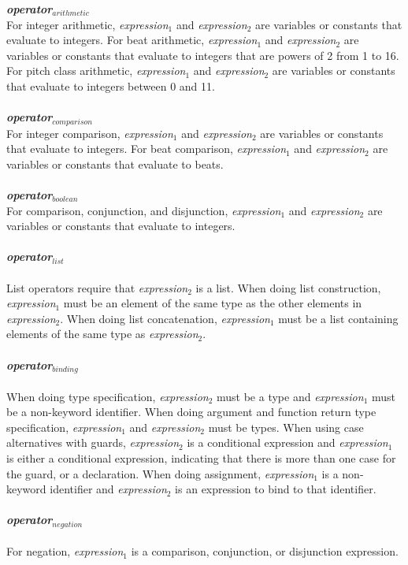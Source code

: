 \textbf{\emph{operator$_{arithmetic}$}} \\
For integer arithmetic, \emph{expression$_{1}$} and \emph{expression$_{2}$} are variables or constants that evaluate to integers. For beat arithmetic, \emph{expression$_{1}$} and \emph{expression$_{2}$} are variables or constants that evaluate to integers that are powers of 2 from 1 to 16. For pitch class arithmetic, \emph{expression$_{1}$} and \emph{expression$_{2}$} are variables or constants that evaluate to integers between 0 and 11.  \\ \\
\textbf{\emph{operator$_{comparison}$}} \\
For integer comparison, \emph{expression$_{1}$} and \emph{expression$_{2}$} are variables or constants that evaluate to integers. For beat comparison, \emph{expression$_{1}$} and \emph{expression$_{2}$} are variables or constants that evaluate to beats. \\ \\
\textbf{\emph{operator$_{boolean}$}} \\
For comparison, conjunction, and disjunction, \emph{expression$_{1}$} and \emph{expression$_{2}$} are variables or constants that evaluate to integers. \\ \\
\textbf{\emph{operator$_{list}$}} \\ \\
List operators require that  \emph{expression$_{2}$} is a list. When doing list construction,  \emph{expression$_{1}$} must be an element of the same type as the other elements in  \emph{expression$_{2}$}. When doing list concatenation,  \emph{expression$_{1}$} must be a list containing elements of the same type as  \emph{expression$_{2}$}. \\ \\
\textbf{\emph{operator$_{binding}$}} \\ \\
When doing type specification, \emph{expression$_{2}$} must be a type and \emph{expression$_{1}$} must be a non-keyword identifier. When doing argument and function return type specification, \emph{expression$_{1}$} and \emph{expression$_{2}$} must be types. When using case alternatives with guards,  \emph{expression$_{2}$} is a conditional expression and  \emph{expression$_{1}$} is either a conditional expression, indicating that there is more than one case for the guard, or a declaration. When doing assignment,  \emph{expression$_{1}$} is a non-keyword identifier and  \emph{expression$_{2}$} is an expression to bind to that identifier. \\ \\
\textbf{\emph{operator$_{negation}$}} \\ \\
For negation,  \emph{expression$_{1}$} is a comparison, conjunction, or disjunction expression.

